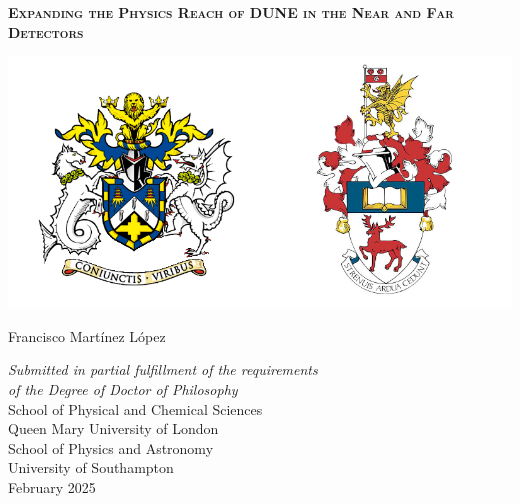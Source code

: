 \begin{titlepage}



\begin{center}

\begin{spacing}{2.5}
{\Huge \textsc{\textbf{Expanding the Physics Reach of DUNE in the Near and Far Detectors}}}
\end{spacing}

\vspace{1.0 cm}

\begin{center}
\includegraphics[width=1.0\textwidth]{Images/uni_arms}
\end{center}
\vspace{0.9cm}


{\LARGE Francisco Mart\'{i}nez L\'{o}pez} %

\vspace{1cm}


{\large %
\textit{Submitted in partial fulfillment of the
requirements \\ of the Degree of Doctor of Philosophy}\\
\vspace{0.9 cm}
School of Physical and Chemical Sciences\\
Queen Mary University of London\\
\vspace{0.5 cm}
School of Physics and Astronomy\\
University of Southampton\\
\vspace{0.5cm}
February 2025 %
}

\end{center}



\end{titlepage}

\restoregeometry  %
\doublespacing		%
